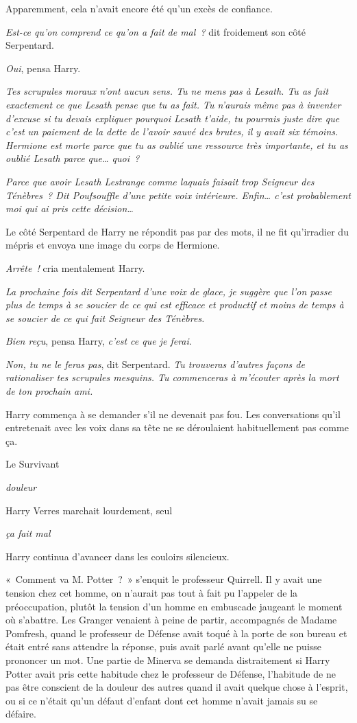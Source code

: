 Apparemment, cela n'avait encore été qu'un excès de confiance.

\emph{Est-ce qu'on comprend ce qu'on a fait de mal~?} dit froidement son côté Serpentard.

\emph{Oui}, pensa Harry.

\emph{Tes scrupules moraux n'ont aucun sens. Tu ne mens pas à Lesath. Tu as fait exactement ce que Lesath pense que tu as fait. Tu n'aurais même pas à inventer d'excuse si tu devais expliquer pourquoi Lesath t'aide, tu pourrais juste dire que c'est un paiement de la dette de l'avoir sauvé des brutes, il y avait six témoins. Hermione est morte parce que tu as oublié une ressource très importante, et tu as oublié Lesath parce que… quoi~?}

\emph{Parce que avoir Lesath Lestrange comme laquais faisait trop Seigneur des Ténèbres~? Dit Poufsouffle d'une petite voix intérieure. Enfin… c'est probablement moi qui ai pris cette décision…}

Le côté Serpentard de Harry ne répondit pas par des mots, il ne fit qu'irradier du mépris et envoya une image du corps de Hermione.

\emph{Arrête~!} cria mentalement Harry.

\emph{La prochaine fois dit Serpentard d'une voix de glace, je suggère que l'on passe plus de temps à se soucier de ce qui est efficace et productif et moins de temps à se soucier de ce qui fait Seigneur des Ténèbres.}

\emph{Bien reçu}, pensa Harry, \emph{c'est ce que je ferai}.

\emph{Non, tu ne le feras pas}, dit Serpentard. \emph{Tu trouveras d'autres façons de rationaliser tes scrupules mesquins. Tu commenceras à m'écouter après la mort de ton prochain ami.}

Harry commença à se demander s'il ne devenait pas fou. Les conversations qu'il entretenait avec les voix dans sa tête ne se déroulaient habituellement pas comme ça.

Le Survivant

\emph{douleur}

Harry Verres marchait lourdement, seul

\emph{ça fait mal}

Harry continua d'avancer dans les couloirs silencieux.

\later

«~Comment va M. Potter~?~» s'enquit le professeur Quirrell. Il y avait une tension chez cet homme, on n'aurait pas tout à fait pu l'appeler de la préoccupation, plutôt la tension d'un homme en embuscade jaugeant le moment où s'abattre. Les Granger venaient à peine de partir, accompagnés de Madame Pomfresh, quand le professeur de Défense avait toqué à la porte de son bureau et était entré sans attendre la réponse, puis avait parlé avant qu'elle ne puisse prononcer un mot. Une partie de Minerva se demanda distraitement si Harry Potter avait pris cette habitude chez le professeur de Défense, l'habitude de ne pas être conscient de la douleur des autres quand il avait quelque chose à l'esprit, ou si ce n'était qu'un défaut d'enfant dont cet homme n'avait jamais su se défaire.


